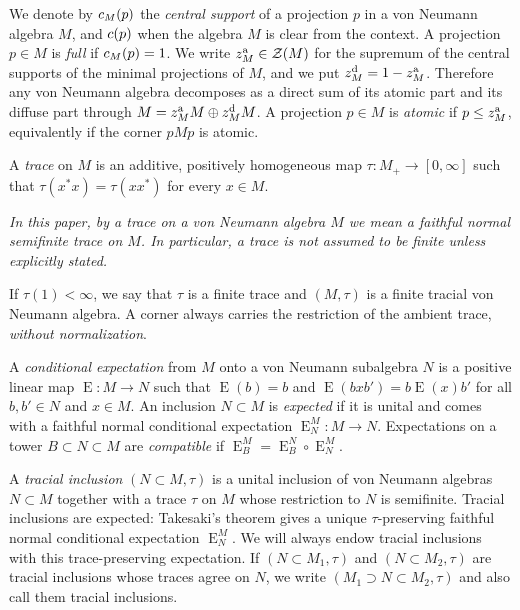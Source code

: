 \documentclass[11pt]{amsart}
\makeatletter
\numberwithin{equation}{section}
\newcommand{\Z}{\mathcal Z}
\newcommand{\rE}{\operatorname{E}}
\newcommand{\@optsub}[1]{\if\relax\detokenize{#1}\relax\else_{#1}\fi}
\newcommand{\csupp}[2][]{c\@optsub{#1}(#2)}
\newcommand{\zat}[1][]{z^{\mathrm{a}}\@optsub{#1}}
\newcommand{\zdiff}[1][]{z^{\mathrm{d}}\@optsub{#1}}
\theoremstyle{definition}
\makeatother
\begin{document}
We denote by $\csupp[M]{p}$ the \emph{central support} of a projection $p$ in a von Neumann algebra $M$, and $\csupp{p}$ when the algebra $M$ is clear from the context. A projection $p\in M$ is \emph{full} if $\csupp[M]{p}=1$. We write $\zat[M]\in\Z(M)$ for the supremum of the central supports of the minimal projections of $M$, and we put $\zdiff[M]=1-\zat[M]$. Therefore any von Neumann algebra decomposes as a direct sum of its atomic part and its diffuse part through $M=\zat[M]M\oplus \zdiff[M]M$. A projection $p\in M$ is \emph{atomic} if $p\leq\zat[M]$, equivalently if the corner $pMp$ is atomic.

A \emph{trace} on $M$ is an additive, positively homogeneous map $\tau:M_+\to[0,\infty]$ such that $\tau(x^*x)=\tau(xx^*)$ for every $x\in M$. 
\begin{center}
    \vspace{\medskipamount}
    \emph{In this paper, by a trace on a von Neumann algebra $M$ we mean a faithful normal semifinite trace on $M$. In particular, a trace is not assumed to be finite unless explicitly stated.}
    \vspace{\medskipamount}
\end{center}
If $\tau(1)<\infty$, we say that $\tau$ is a finite trace and $(M,\tau)$ is a finite tracial von Neumann algebra. A corner always carries the restriction of the ambient trace, \emph{without normalization}.

A \emph{conditional expectation} from $M$ onto a von Neumann subalgebra $N$ is a positive linear map $\rE:M\to N$ such that $\rE(b)=b$ and $\rE(bxb')=b\rE(x)b'$ for all $b,b'\in N$ and $x\in M$. An inclusion $N\subset M$ is \emph{expected} if it is unital and comes with a faithful normal conditional expectation $\rE_N^M:M\to N$. Expectations on a tower $B\subset N\subset M$ are \emph{compatible} if $\rE_B^M=\rE_B^N\circ\rE_N^M$. 

A \emph{tracial inclusion} $(N\subset M,\tau)$ is a unital inclusion of von Neumann algebras $N\subset M$ together with a trace $\tau$ on $M$ whose restriction to $N$ is semifinite. Tracial inclusions are expected: Takesaki's theorem \cite[Theorem~IX.4.2]{Ta03} gives a unique $\tau$-preserving faithful normal conditional expectation $\rE_N^M$. We will always endow tracial inclusions with this trace-preserving expectation. If $(N\subset M_1,\tau)$ and $(N\subset M_2,\tau)$ are tracial inclusions whose traces agree on $N$, we write $(M_1\supset N\subset M_2,\tau)$ and also call them tracial inclusions.
\end{document}
